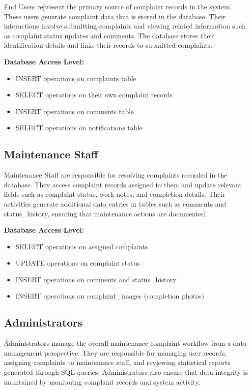 \documentclass[12pt,a4paper]{article}
\begin{document}
End Users represent the primary source of complaint records in the system. These users generate complaint data that is stored in the database. Their interactions involve submitting complaints and viewing related information such as complaint status updates and comments. The database stores their identification details and links their records to submitted complaints.

\textbf{Database Access Level:}
\begin{itemize}
    \item INSERT operations on complaints table
    \item SELECT operations on their own complaint records
    \item INSERT operations on comments table
    \item SELECT operations on notifications table
\end{itemize}

\subsection{Maintenance Staff}

Maintenance Staff are responsible for resolving complaints recorded in the database. They access complaint records assigned to them and update relevant fields such as complaint status, work notes, and completion details. Their activities generate additional data entries in tables such as comments and status\_history, ensuring that maintenance actions are documented.

\textbf{Database Access Level:}
\begin{itemize}
    \item SELECT operations on assigned complaints
    \item UPDATE operations on complaint status
    \item INSERT operations on comments and status\_history
    \item INSERT operations on complaint\_images (completion photos)
\end{itemize}

\subsection{Administrators}

Administrators manage the overall maintenance complaint workflow from a data management perspective. They are responsible for managing user records, assigning complaints to maintenance staff, and reviewing statistical reports generated through SQL queries. Administrators also ensure that data integrity is maintained by monitoring complaint records and system activity.
\end{document}
